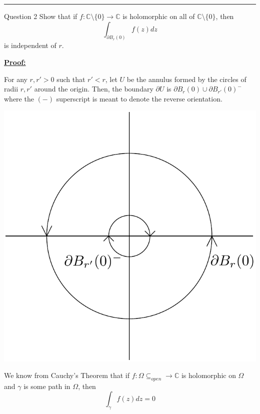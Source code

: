 \documentclass{article}
\newcommand{\C}{\mathbb{C}}
\begin{document}
\vskip 0.5cm
\hrule 
\vskip 0.5cm




\begin{mathdefinitionbox}{Question 2}
\vskip 0.5cm
Show that if $f : \C \setminus \{0\}  \rightarrow \C$ is holomorphic on all of $\C \setminus \{0\}$, then
\[ \int_{\partial B_r(0)} f(z)dz \]
is independent of $r$.
\end{mathdefinitionbox}

\vskip 0.5cm
\underline{\textbf{Proof:}}

For any $r, r' > 0$ such that $r' < r$, let $U$ be the annulus formed by the circles of radii $r, r'$ around the origin. Then, the boundary $\partial U$ is $\partial B_r(0) \cup \partial B_{r'}(0)^{-}$ where the $(-)$ superscript is meant to denote the reverse orientation.

\begin{center}
  \includegraphics[scale=0.35]{Q2 HW 3.png}
\end{center}

We know from Cauchy's Theorem that if $f : \Omega \subseteq_{open} \rightarrow \C$ is holomorphic on $\Omega$ and $\gamma$ is some path in $\Omega$, then 
\[ \int_{\gamma} f(z) dz = 0 \]
\end{document}

